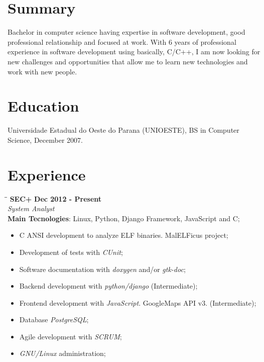 \documentclass[margin]{res}
\begin{document}
  

\address{Florianopolis,  Brazil \\ benatto@gmail.com \\ +55 (48) 99767365 }
                           
                        
\begin{resume}                        
 
\section{Summary}       Bachelor in computer science having expertise in software development, good professional relationship and focused at work.
                        With 6 years of professional experience in software development using basically, C/C++, I am now looking for new challenges
                        and opportunities that allow me to learn new technologies and work with new people.
 
\section{Education}	Universidade Estadual do Oeste do Parana (UNIOESTE),  BS in Computer Science, December 2007.
  
\section{Experience}      

\vspace{-0.1in}
   \begin{tabbing}
   \hspace{2.3in}\= \hspace{1.7in}\= \kill %
    \textbf{SEC+}    \>\>\textbf{Dec 2012 - Present}\\
    \textit{System Analyst}\\        
    \textbf{Main Tecnologies}: Linux, Python, Django Framework, JavaScript and C;
   \end{tabbing}\vspace{-20pt}      %
    \vspace{5mm}
    \begin{itemize}
     \item C ANSI development to analyze ELF binaries. MalELFicus project;
     \item Development of tests with \textit{CUnit};
     \item Software documentation with \textit{doxygen} and/or \textit{gtk-doc};
     \item Backend development with \textit{python/django} (Intermediate);
     \item Frontend development with \textit{JavaScript}. GoogleMaps API v3. (Intermediate);
     \item Database \textit{PostgreSQL};
     \item Agile development with \textit{SCRUM};
     \item \textit{GNU/Linux} administration;
    \end{itemize}



\end{resume}
\end{document}
